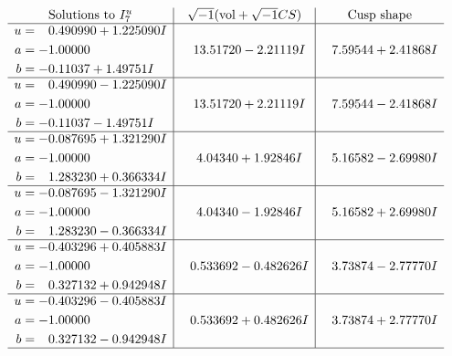\documentclass[1p]{elsarticle_modified}
\theoremstyle{definition}
\newcommand{\I}{\sqrt{-1}}
\begin{document}
$$\begin{array}{c|c|c}  
\text{Solutions to }I^u_{7}& \I (\text{vol} + \sqrt{-1}CS) & \text{Cusp shape}\\
 \hline 
\begin{aligned}
u &= \phantom{-}0.490990 + 1.225090 I \\
a &= -1.00000\phantom{ +0.000000I} \\
b &= -0.11037 + 1.49751 I\end{aligned}
 & \phantom{-}13.51720 - 2.21119 I & \phantom{-}7.59544 + 2.41868 I \\ \hline\begin{aligned}
u &= \phantom{-}0.490990 - 1.225090 I \\
a &= -1.00000\phantom{ +0.000000I} \\
b &= -0.11037 - 1.49751 I\end{aligned}
 & \phantom{-}13.51720 + 2.21119 I & \phantom{-}7.59544 - 2.41868 I \\ \hline\begin{aligned}
u &= -0.087695 + 1.321290 I \\
a &= -1.00000\phantom{ +0.000000I} \\
b &= \phantom{-}1.283230 + 0.366334 I\end{aligned}
 & \phantom{-}4.04340 + 1.92846 I & \phantom{-}5.16582 - 2.69980 I \\ \hline\begin{aligned}
u &= -0.087695 - 1.321290 I \\
a &= -1.00000\phantom{ +0.000000I} \\
b &= \phantom{-}1.283230 - 0.366334 I\end{aligned}
 & \phantom{-}4.04340 - 1.92846 I & \phantom{-}5.16582 + 2.69980 I \\ \hline\begin{aligned}
u &= -0.403296 + 0.405883 I \\
a &= -1.00000\phantom{ +0.000000I} \\
b &= \phantom{-}0.327132 + 0.942948 I\end{aligned}
 & \phantom{-}0.533692 - 0.482626 I & \phantom{-}3.73874 - 2.77770 I \\ \hline\begin{aligned}
u &= -0.403296 - 0.405883 I \\
a &= -1.00000\phantom{ +0.000000I} \\
b &= \phantom{-}0.327132 - 0.942948 I\end{aligned}
 & \phantom{-}0.533692 + 0.482626 I & \phantom{-}3.73874 + 2.77770 I\\
 \hline 
 \end{array}$$\newpage\newpage\renewcommand{\arraystretch}{1}
\end{document}
